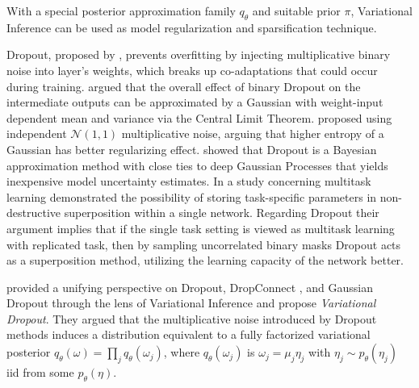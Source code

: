 \documentclass[a4paper,10pt,twocolumn]{article}
\begin{document}
With a special posterior approximation family $q_\theta$ and suitable prior $\pi$,
Variational Inference can be used as model regularization and sparsification technique.

Dropout, proposed by \citet{hinton_improving_2012}, prevents overfitting by injecting
multiplicative binary noise into layer's weights, which breaks up co-adaptations that
could occur during training. \citet{wang_fast_2013} argued that the overall effect of
binary Dropout on the intermediate outputs can be approximated by a Gaussian with weight-input
dependent mean and variance via the Central Limit Theorem. \citet{srivastava_dropout_2014}
proposed using independent $\mathcal{N}(1, 1)$ multiplicative noise, arguing that higher
entropy of a Gaussian has better regularizing effect. \citet{gal_dropout_2016} showed
that Dropout is a Bayesian approximation method with close ties to deep Gaussian Processes
that yields inexpensive model uncertainty estimates. In a study concerning multitask learning
\citet{cheung_superposition_2019} demonstrated the possibility of storing task-specific
parameters in non-destructive superposition within a single network. Regarding Dropout
their argument implies that if the single task setting is viewed as multitask learning
with replicated task, then by sampling uncorrelated binary masks Dropout acts as a
superposition method, utilizing the learning capacity of the network better.

%
\citet{kingma_variational_2015} provided a unifying perspective on Dropout, DropConnect
\citep{wan_regularization_2013}, and Gaussian Dropout \citep{wang_fast_2013} through
the lens of Variational Inference and propose \emph{Variational Dropout}. They argued
that the multiplicative noise introduced by Dropout methods induces a distribution
equivalent to a fully factorized variational posterior $
  q_\theta(\omega) = \prod_j q_{\theta}(\omega_j)
$, where $q_{\theta}(\omega_j)$ is $\omega_j = \mu_j \eta_j$ with $
  \eta_j \sim p_\theta(\eta_j)
$ iid from some $p_\theta(\eta)$.
%
\end{document}

